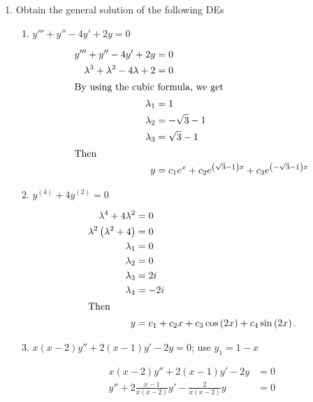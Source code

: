 \documentclass{zc-ust-hw}
\begin{document}
\maketitle

\begin{enumerate}
  \item Obtain the general solution of the following DEs
    \begin{enumerate}
      \item \( y'''+y''-4y'+2y=0 \)
        \begin{sol}
          \begin{align}
            y'''+y''-4y'+2y&=0 \\
            \lambda^3 + \lambda^2 - 4\lambda + 2 &= 0 \\
            \intertext{By using the cubic formula, we get}
            \lambda_1 &= 1 \\
            \lambda_2 &= -\sqrt{3} -1 \\
            \lambda_3 &= \sqrt{3} -1 \\
            \intertext{Then}
            y &= c_1e^{x} + c_2e^{\left( \sqrt{3} -1 \right) x} + c_3e^{\left( -\sqrt{3} -1 \right) x}
          \end{align}
        \end{sol}
      \item \( y^{(4)}+4y^{(2)}=0   \)
        \begin{sol}
          \begin{align}
            \lambda ^{4}+4\lambda ^{2}&=0 \\ 
            \lambda ^{2}\left( \lambda ^{2}+4 \right)&=0 \\
            \lambda _{1}&=0 \\
            \lambda _{2}&=0 \\
            \lambda _{3}&=2i \\
            \lambda _{4}&=-2i \\
            \intertext{Then}
            y &= c_1 + c_2x + c_3\cos\left( 2x \right) + c_4\sin\left( 2x \right)
          .\end{align}
        \end{sol}
        \newpage
        \item \( x(x-2)y''+2(x-1)y'-2y=0 \); use \( y_{1}=1-x \)
          \begin{sol}
            \begin{align}
              x(x-2)y''+2(x-1)y'-2y&=0 \\
              y''+2\frac{x-1}{x(x-2)}y'-\frac{2}{x(x-2)}y&=0

\end{align}
\end{sol}
\end{enumerate}
\end{enumerate}
\end{document}
